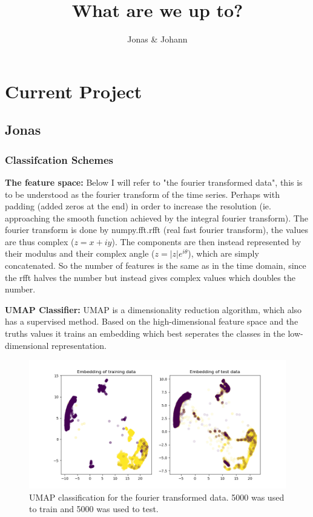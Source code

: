 \documentclass{article}
\title{What are we up to?}
\author{Jonas \& Johann}
\begin{document}
\maketitle

\section{Current Project}
\subsection{Jonas}
\subsubsection{Classifcation Schemes}
\textbf{The feature space:}
Below I will refer to "the fourier transformed data", this is to be understood as the fourier transform of the time series. Perhaps with padding (added zeros at the end) in order to increase the resolution (ie. approaching the smooth function achieved by the integral fourier transform).
The fourier transform is done by numpy.fft.rfft (real fast fourier transform), the values are thus complex ($z = x + iy$).
The components are then instead represented by their modulus and their complex angle ($z = |z|e^{i\theta}$), which are simply concatenated.
So the number of features is the same as in the time domain, since the rfft halves the number but instead gives complex values which doubles the number.

\textbf{UMAP Classifier:}
UMAP is a dimensionality reduction algorithm, which also has a supervised method. Based on the high-dimensional feature space and the truths values it trains an embedding which best seperates the classes in the low-dimensional representation.

\begin{figure}
    \centering
    \includegraphics[width=\linewidth]{code_jonas/figures/UMAP_preliminary_classification.png}
    \caption{UMAP classification for the fourier transformed data. 5000 was used to train and 5000 was used to test.}
    \label{fig:UMAP_Classification}
\end{figure}
\end{document}
